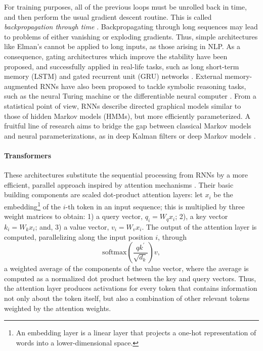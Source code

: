 For training purposes, all of the previous loops must be unrolled back in time, and then perform the usual gradient descent routine.
This is called \emph{backpropagation through time} \parencite{58337}.
Backpropagating through long sequences may lead to problems
of either vanishing or exploding gradients. Thus, 
simple architectures like Elman's cannot be applied to long inputs, as those arising in NLP. 
As a consequence, gating architectures which improve the stability have been proposed, and successfully applied in real-life tasks,
such as long 
short-term memory (LSTM) \parencite{hochreiter1997long} and gated recurrent unit (GRU) networks \parencite{cho2014learning}. 
External memory-augmented RNNs have also been proposed to tackle symbolic reasoning tasks, such as the neural Turing machine \parencite{graves2014neural} or the differentiable neural computer \parencite{graves2016hybrid}.
From a statistical point of view, RNNs describe directed graphical models similar to those of hidden Markov models (HMMs), but more efficiently parameterized. A fruitful line of research aims to bridge the gap between classical Markov models and neural parameterizations, as in deep Kalman filters \parencite{krishnan2015deep} or deep Markov models \parencite{krishnan2016structured}.



\paragraph{Transformers} These architectures substitute the sequential processing from RNNs by a more efficient, parallel approach inspired by 
attention mechanisms \parencite{vaswani2017attention,bahdanau2014neural}. Their basic building components are scaled dot-product attention layers:
let $x_i$ be the embedding\footnote{An embedding layer is a linear layer that projects a one-hot representation of words into a lower-dimensional space.} of the $i$-th token in an input sequence;
this is multiplied by three weight matrices to obtain: 1) a query vector, $q_i = W_q x_i$; 2), 
 a key vector $k_i = W_k x_i$;
 and, 3) a value vector, $v_i = W_v x_i$. The output of the attention layer is computed, parallelizing along the input position $i$, 
 through 
$$
\mbox{softmax}\left(\frac{q k^{'}}{\sqrt{d_k}}\right) v,
$$
 a weighted average of the components of the value vector, where the average is 
computed as a normalized dot product between the key and query vectors. Thus, the attention layer produces activations for every token  that contains information not only about the token itself, but also a combination of other relevant tokens weighted by the attention weights.

